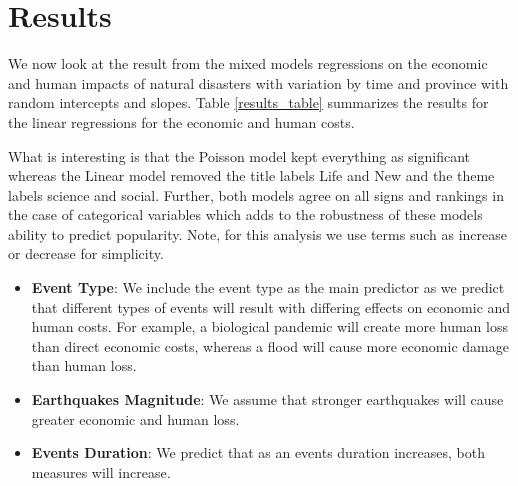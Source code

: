 \section{Results}
We now look at the result from the mixed models regressions on the economic and human impacts of natural disasters with variation by time and province with random intercepts and slopes. Table \ref{results_table} summarizes the results for the linear regressions for the economic and human costs.



What is interesting is that the Poisson model kept everything as significant whereas the Linear model removed the title labels Life and New and the theme labels science and social. Further, both models agree on all signs and rankings in the case of categorical variables which adds to the robustness of these models ability to predict popularity. 
Note, for this analysis we use terms such as increase or decrease for simplicity.

\begin{itemize}
	\item \textbf{Event Type}: We include the event type as the main predictor as we predict that different types of events will result with differing effects on economic and human costs. For example, a biological pandemic will create more human loss than direct economic costs, whereas a flood will cause more economic damage than human loss.
	\item \textbf{Earthquakes Magnitude}: We assume that stronger earthquakes will cause greater economic and human loss.
	\item \textbf{Events Duration}: We predict that as an events duration increases, both measures will increase. 
\end{itemize}


